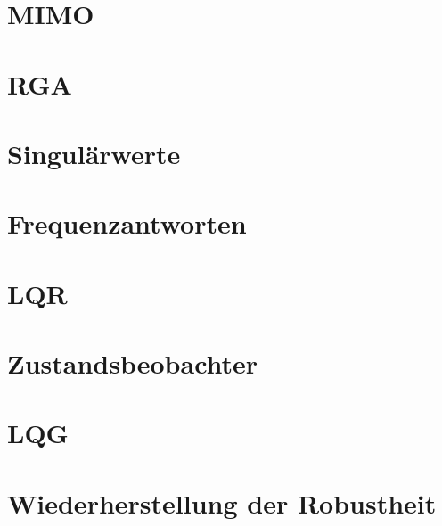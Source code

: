 \begin{multicols*}{3}
\vfill\null\columnbreak 
\section{MIMO}
    
    
    

\vfill\null\columnbreak 
\section{RGA}
    

\vfill\null\columnbreak 
\section{Singulärwerte}
    
  
\vfill\null\columnbreak  
\section{Frequenzantworten}
    
    
    
    
\vfill\null\columnbreak
\section{LQR}
    
    
    
    
    
    
    
\vfill\null\columnbreak
\section{Zustandsbeobachter}
    
    
    
\section{LQG}
    
    
    
    
    
\section{Wiederherstellung der Robustheit}
    
    
\end{multicols*}     

